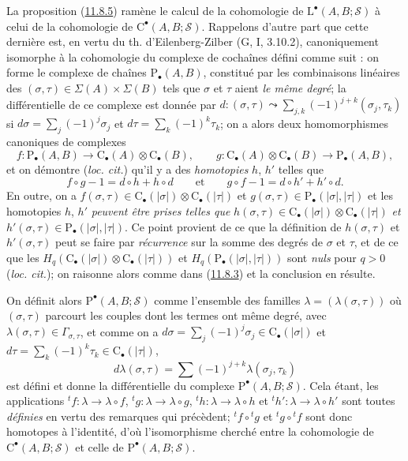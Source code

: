 \begin{env}[11.8.6]
\label{0.11.8.6-fr}
La proposition (\hyperref[0.11.8.5-fr]{11.8.5}) ramène le calcul de la
cohomologie de $\mathrm L^\bullet(A,B;\mathscr S)$ à celui de la cohomologie de
$\mathrm C^\bullet(A,B;\mathscr S)$. Rappelons d'autre part que cette dernière
est, en vertu du th. d'Eilenberg-Zilber (G, I, 3.10.2), canoniquement
isomorphe à la cohomologie du complexe de cochaînes défini comme suit : on
forme le complexe de chaînes $\mathrm P_\bullet(A,B)$, constitué par les
combinaisons linéaires des $(\sigma,\tau)\in\Sigma(A)\times\Sigma(B)$ tels
que $\sigma$ et $\tau$ aient \emph{le même degré}; la différentielle de ce complexe
est donnée par
$d:(\sigma,\tau)\leadsto\sum_{j,k}(-1)^{j+k}(\sigma_j,\tau_k)$ si
$d\sigma=\sum_j(-1)^j\sigma_j$ et $d\tau=\sum_k(-1)^k\tau_k$;
on a alors deux homomorphismes canoniques de complexes
\[
f:\mathrm P_\bullet(A,B)\longrightarrow
\mathrm C_\bullet(A)\otimes\mathrm C_\bullet(B),\qquad
g:\mathrm C_\bullet(A)\otimes\mathrm C_\bullet(B)
\longrightarrow\mathrm P_\bullet(A,B),
\]
et on démontre (\emph{loc. cit.}) qu'il y a des \emph{homotopies} $h$, $h'$ telles
que
\[
f\circ g-1=d\circ h+h\circ d\qquad\text{et}\qquad
g\circ f-1=d\circ h'+h'\circ d.
\]
En outre, on a
$f(\sigma,\tau)\in\mathrm C_\bullet(|\sigma|)
\otimes\mathrm C_\bullet(|\tau|)$ et
$g(\sigma,\tau)\in\mathrm P_\bullet(|\sigma|,|\tau|)$
et les homotopies $h$, $h'$ \emph{peuvent être prises telles que}
$h(\sigma,\tau)\in\mathrm C_\bullet(|\sigma|)
\otimes\mathrm C_\bullet(|\tau|)$ \emph{et}
$h'(\sigma,\tau)\in\mathrm P_\bullet(|\sigma|,|\tau|)$.
Ce point provient de ce que la définition de $h(\sigma,\tau)$ et
$h'(\sigma,\tau)$ peut se faire par \emph{récurrence} sur la somme des degrés de
$\sigma$ et $\tau$, et de ce que les
$H_q(\mathrm C_\bullet(|\sigma|)\otimes\mathrm C_\bullet(|\tau|))$ et
$H_q(\mathrm P_\bullet(|\sigma|,|\tau|))$
sont \emph{nuls} pour $q>0$ (\emph{loc. cit.}); on raisonne alors comme dans
(\hyperref[0.11.8.3-fr]{11.8.3}) et la conclusion en résulte.

On définit alors $\mathrm P^\bullet(A,B;\mathscr S)$ comme l'ensemble des
familles $\lambda=(\lambda(\sigma,\tau))$ où $(\sigma,\tau)$ parcourt les
couples dont les termes ont même degré, avec
$\lambda(\sigma,\tau)\in\Gamma_{\sigma,\tau}$, et comme on a
$d\sigma=\sum_j(-1)^j\sigma_j\in\mathrm C_\bullet(|\sigma|)$ et
$d\tau=\sum_k(-1)^k\tau_k\in\mathrm C_\bullet(|\tau|)$,
\[
d\lambda(\sigma,\tau)=
\sum(-1)^{j+k}\lambda(\sigma_j,\tau_k)
\]
est défini et donne la différentielle du complexe
$\mathrm P^\bullet(A,B;\mathscr S)$. Cela étant, les applications
${}^tf:\lambda\to\lambda\circ f$, ${}^tg:\lambda\to\lambda\circ g$,
${}^th:\lambda\to\lambda\circ h$ et ${}^th':\lambda\to\lambda\circ h'$
sont toutes \emph{définies} en vertu des remarques qui précèdent;
${}^tf\circ{}^tg$ et ${}^tg\circ{}^tf$ sont donc homotopes à
l'identité, d'où l'isomorphisme cherché entre la cohomologie de
$\mathrm C^\bullet(A,B;\mathscr S)$ et celle de
$\mathrm P^\bullet(A,B;\mathscr S)$.
\end{env}

